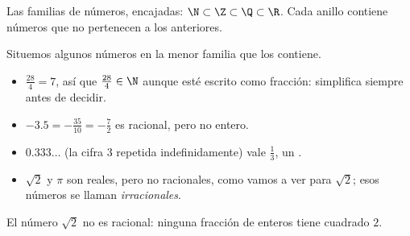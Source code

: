 \begin{omfigure}

{\small Las familias de números, encajadas: $\N \subset \Z \subset \Q \subset
\R$. Cada anillo contiene números que no pertenecen a los anteriores.}
\end{omfigure}

\begin{example}\label{ex:g10:numbers:classify}
Situemos algunos números en la menor familia que los contiene.
\begin{itemize}
  \item $\frac{28}{4} = 7$, así que $\frac{28}{4} \in \N$ aunque esté
        escrito como fracción: simplifica siempre antes de decidir.
  \item $-3.5 = -\frac{35}{10} = -\frac72$ es racional, pero no entero.
  \item $0.333\dots$ (la cifra $3$ repetida indefinidamente) vale
        $\frac13$, un .
  \item $\sqrt 2$ y $\pi$ son reales, pero no racionales, como vamos a ver
        para $\sqrt 2$; esos números se llaman
        \emph{irracionales}.
\end{itemize}
\end{example}

\begin{theorem}\label{thm:g10:numbers:sqrt2}
El número $\sqrt 2$ no es racional: ninguna fracción de enteros tiene
cuadrado $2$.
\end{theorem}

